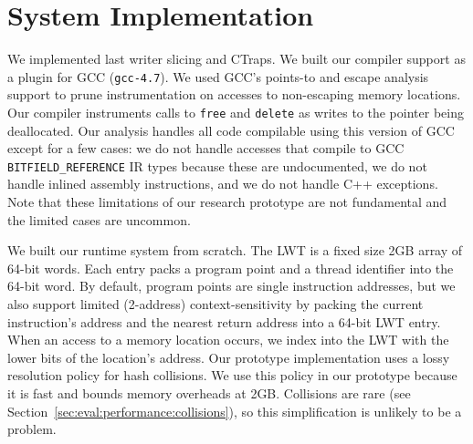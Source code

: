 \documentclass[preprint,10pt]{sigplanconf}
\newcommand{\ctraps}{CTraps\xspace}
\begin{document}

\section{System Implementation}
\label{sec:implementation}
We implemented last writer slicing and \ctraps.  We built our compiler support
as a plugin for GCC ({\tt gcc-4.7}).  We used GCC's points-to and
escape analysis support to prune instrumentation on accesses to non-escaping memory
locations.  Our compiler instruments calls to {\tt free} and {\tt delete} as
writes to the pointer being deallocated.  Our analysis handles all code
compilable using this version of GCC except for a few cases: we do not handle
accesses that compile to GCC {\tt BITFIELD\_REFERENCE} IR types because these
are undocumented, we do not handle inlined assembly instructions, and we do not
handle C++ exceptions.  Note that these limitations of our research prototype
are not fundamental and the limited cases are uncommon.   

We built our runtime system from scratch.  The LWT is a fixed size 2GB array of
64-bit words.  Each entry packs a program point and a thread identifier into
the 64-bit word.  By default, program points are single instruction addresses,
but we also support limited (2-address) context-sensitivity by packing the
current instruction's address and the nearest return address into a 64-bit LWT
entry. When an access to a memory location occurs, we index into the LWT with
the lower bits of the location's address.  Our prototype implementation uses a
lossy resolution policy for hash collisions.  We use this policy in our
prototype because it is fast and bounds memory overheads at 2GB.  Collisions
are rare (see Section~\ref{sec:eval:performance:collisions}), so this
simplification is unlikely to be a problem.  
\end{document}
